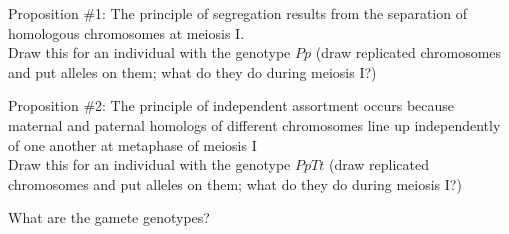 \begin{frame}[t]
    \begin{adjustwidth}{-2em}{-1.5em}
    \vspace{-4mm}
    Proposition \#1: The principle of segregation results from the separation
    of homologous chromosomes at meiosis I. \\

    \vspace{3mm}
    Draw this for an individual with the genotype $Pp$ (draw replicated
    chromosomes and put alleles on them; what do they do during meiosis I?) \\

    
    \end{adjustwidth}

\end{frame}

\begin{frame}[t]
    \begin{adjustwidth}{-2em}{-1.5em}
    \vspace{-4mm}
    Proposition \#2: The principle of independent assortment occurs because
    maternal and paternal homologs of different chromosomes line up
    independently of one another at metaphase of meiosis I \\

    \vspace{3mm}
    Draw this for an individual with the genotype $PpTt$ (draw replicated
    chromosomes and put alleles on them; what do they do during meiosis I?) \\


    \vspace{0.42\textheight}
    What are the gamete genotypes? 

    \end{adjustwidth}

\end{frame}

